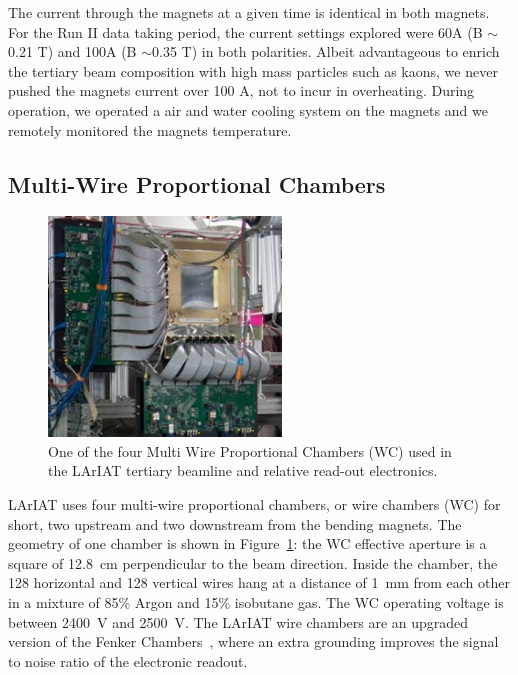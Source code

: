 The current through the magnets at a given time is identical in both magnets. For the Run II data taking period, the current settings explored were 60A (B $\sim$0.21 T) and 100A (B $\sim$0.35 T) in both polarities. 
Albeit advantageous to enrich the tertiary beam composition with high mass particles such as kaons, we never pushed the magnets current over 100 A, not to incur in overheating.  During operation, we operated a air and water cooling system on the magnets and we remotely monitored the magnets temperature.
 
\subsection{Multi-Wire Proportional Chambers}\label{sec:MWPC}
\begin{figure}[!h]
\begin{centering}
\vspace{-0.3cm}
\includegraphics[height=2.3in]{Chapter-3/Images/WireChamber.png}
\caption{
{One of the four Multi Wire Proportional Chambers (WC) used in the LArIAT tertiary beamline and relative read-out electronics.}
}
\label{fig:wirechamber}
\end{centering}
\end{figure}

LArIAT uses four multi-wire proportional chambers, or wire chambers (WC) for short, two upstream and two downstream from the bending magnets. The geometry of one chamber is shown in Figure~\ref{fig:wirechamber}: the WC effective aperture is a square of  12.8~cm perpendicular to the beam direction.  Inside the chamber, the 128 horizontal and 128 vertical wires hang at a distance of 1~mm from each other in a mixture of 85\% Argon and 15\% isobutane gas.  The WC operating voltage is between 2400~V and 2500~V. The LArIAT wire chambers are an upgraded version of the Fenker Chambers~\cite{Fenker}, where an extra grounding improves the signal to noise ratio of the electronic readout.  

